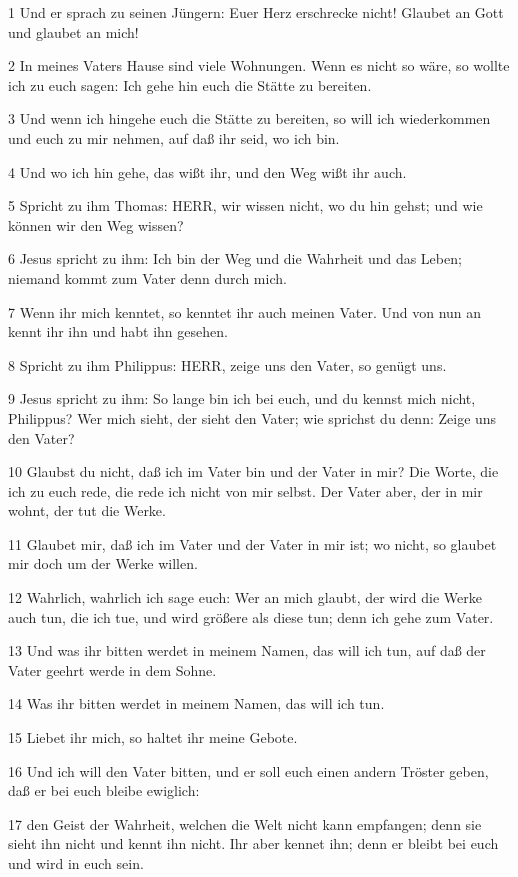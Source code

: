 \par 1 Und er sprach zu seinen Jüngern: Euer Herz erschrecke nicht! Glaubet an Gott und glaubet an mich!
\par 2 In meines Vaters Hause sind viele Wohnungen. Wenn es nicht so wäre, so wollte ich zu euch sagen: Ich gehe hin euch die Stätte zu bereiten.
\par 3 Und wenn ich hingehe euch die Stätte zu bereiten, so will ich wiederkommen und euch zu mir nehmen, auf daß ihr seid, wo ich bin.
\par 4 Und wo ich hin gehe, das wißt ihr, und den Weg wißt ihr auch.
\par 5 Spricht zu ihm Thomas: HERR, wir wissen nicht, wo du hin gehst; und wie können wir den Weg wissen?
\par 6 Jesus spricht zu ihm: Ich bin der Weg und die Wahrheit und das Leben; niemand kommt zum Vater denn durch mich.
\par 7 Wenn ihr mich kenntet, so kenntet ihr auch meinen Vater. Und von nun an kennt ihr ihn und habt ihn gesehen.
\par 8 Spricht zu ihm Philippus: HERR, zeige uns den Vater, so genügt uns.
\par 9 Jesus spricht zu ihm: So lange bin ich bei euch, und du kennst mich nicht, Philippus? Wer mich sieht, der sieht den Vater; wie sprichst du denn: Zeige uns den Vater?
\par 10 Glaubst du nicht, daß ich im Vater bin und der Vater in mir? Die Worte, die ich zu euch rede, die rede ich nicht von mir selbst. Der Vater aber, der in mir wohnt, der tut die Werke.
\par 11 Glaubet mir, daß ich im Vater und der Vater in mir ist; wo nicht, so glaubet mir doch um der Werke willen.
\par 12 Wahrlich, wahrlich ich sage euch: Wer an mich glaubt, der wird die Werke auch tun, die ich tue, und wird größere als diese tun; denn ich gehe zum Vater.
\par 13 Und was ihr bitten werdet in meinem Namen, das will ich tun, auf daß der Vater geehrt werde in dem Sohne.
\par 14 Was ihr bitten werdet in meinem Namen, das will ich tun.
\par 15 Liebet ihr mich, so haltet ihr meine Gebote.
\par 16 Und ich will den Vater bitten, und er soll euch einen andern Tröster geben, daß er bei euch bleibe ewiglich:
\par 17 den Geist der Wahrheit, welchen die Welt nicht kann empfangen; denn sie sieht ihn nicht und kennt ihn nicht. Ihr aber kennet ihn; denn er bleibt bei euch und wird in euch sein.
